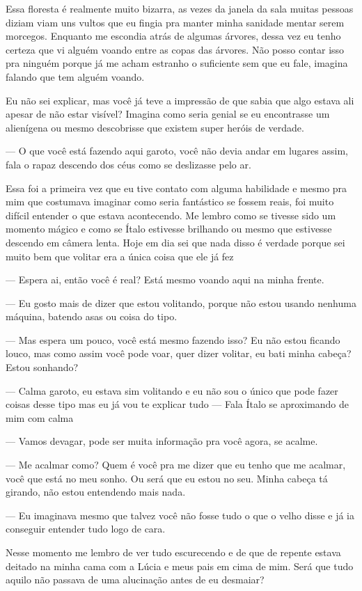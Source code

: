 Essa floresta é realmente muito bizarra, as vezes da janela da sala muitas pessoas diziam viam uns vultos que eu fingia pra manter minha sanidade mentar serem morcegos. Enquanto me escondia atrás de algumas árvores, dessa vez eu tenho certeza que vi alguém voando entre as copas das árvores. Não posso contar isso pra ninguém porque já me acham estranho o suficiente sem que eu fale, imagina falando que tem alguém voando.

Eu não sei explicar, mas você já teve a impressão de que sabia que algo estava ali apesar de não estar visível? Imagina como seria genial se eu encontrasse um alienígena ou mesmo descobrisse que existem super heróis de verdade.

— O que você está fazendo aqui garoto, você não devia andar em lugares assim, fala o rapaz descendo dos céus como se deslizasse pelo ar.

Essa foi a primeira vez que eu tive contato com alguma habilidade e mesmo pra mim que costumava imaginar como seria fantástico se fossem reais, foi muito difícil entender o que estava acontecendo. Me lembro como se tivesse sido um momento mágico e como se Ítalo estivesse brilhando ou mesmo que estivesse descendo em câmera lenta. Hoje em dia sei que nada disso é verdade porque sei muito bem que volitar era a única coisa que ele já fez

— Espera ai, então você é real? Está mesmo voando aqui na minha frente.

— Eu gosto mais de dizer que estou volitando, porque não estou usando nenhuma máquina, batendo asas ou coisa do tipo.

— Mas espera um pouco, você está mesmo fazendo isso? Eu não estou ficando louco, mas como assim você pode voar, quer dizer volitar, eu bati minha cabeça? Estou sonhando?

— Calma garoto, eu estava sim volitando e eu não sou o único que pode fazer coisas desse tipo mas eu já vou te explicar tudo — Fala Ítalo se aproximando de mim com calma 

— Vamos devagar, pode ser muita informação pra você agora, se acalme.

— Me acalmar como? Quem é você pra me dizer que eu tenho que me acalmar, você que está no meu sonho. Ou será que eu estou no seu. Minha cabeça tá girando, não estou entendendo mais nada.

— Eu imaginava mesmo que talvez você não fosse tudo o que o velho disse e já ia conseguir entender tudo logo de cara.

Nesse momento me lembro de ver tudo escurecendo e de que de repente estava deitado na minha cama com a Lúcia e meus pais em cima de mim. Será que tudo aquilo não passava de uma alucinação antes de eu desmaiar?

